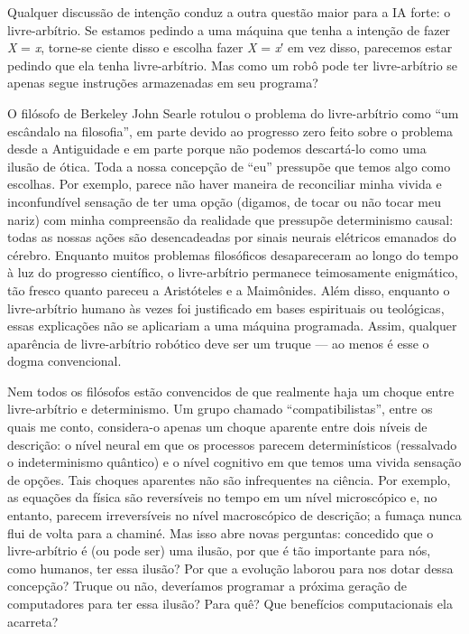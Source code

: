 \documentclass[11pt,a5paper,twoside]{book}
\begin{document}
Qualquer discussão de intenção conduz a outra questão maior para a IA forte: o livre-arbítrio. Se estamos pedindo a uma máquina que tenha a intenção de fazer \textit{X} = \textit{x}, torne-se ciente disso e escolha fazer \textit{X} = \textit{x}′ em vez disso, parecemos estar pedindo que ela tenha livre-arbítrio. Mas como um robô pode ter livre-arbítrio se apenas segue instruções armazenadas em seu programa?

O filósofo de Berkeley John Searle rotulou o problema do livre-arbítrio como “um escândalo na filosofia”, em parte devido ao progresso zero feito sobre o problema desde a Antiguidade e em parte porque não podemos descartá-lo como uma ilusão de ótica. Toda a nossa concepção de “eu” pressupõe que temos algo como escolhas. Por exemplo, parece não haver maneira de reconciliar minha vivida e inconfundível sensação de ter uma opção (digamos, de tocar ou não tocar meu nariz) com minha compreensão da realidade que pressupõe determinismo causal: todas as nossas ações são desencadeadas por sinais neurais elétricos emanados do cérebro. Enquanto muitos problemas filosóficos desapareceram ao longo do tempo à luz do progresso científico, o livre-arbítrio permanece teimosamente enigmático, tão fresco quanto pareceu a Aristóteles e a Maimônides. Além disso, enquanto o livre-arbítrio humano às vezes foi justificado em bases espirituais ou teológicas, essas explicações não se aplicariam a uma máquina programada. Assim, qualquer aparência de livre-arbítrio robótico deve ser um truque — ao menos é esse o dogma convencional.

Nem todos os filósofos estão convencidos de que realmente haja um choque entre livre-arbítrio e determinismo. Um grupo chamado “compatibilistas”, entre os quais me conto, considera-o apenas um choque aparente entre dois níveis de descrição: o nível neural em que os processos parecem determinísticos (ressalvado o indeterminismo quântico) e o nível cognitivo em que temos uma vivida sensação de opções. Tais choques aparentes não são infrequentes na ciência. Por exemplo, as equações da física são reversíveis no tempo em um nível microscópico e, no entanto, parecem irreversíveis no nível macroscópico de descrição; a fumaça nunca flui de volta para a chaminé. Mas isso abre novas perguntas: concedido que o livre-arbítrio é (ou pode ser) uma ilusão, por que é tão importante para nós, como humanos, ter essa ilusão? Por que a evolução laborou para nos dotar dessa concepção? Truque ou não, deveríamos programar a próxima geração de computadores para ter essa ilusão? Para quê? Que benefícios computacionais ela acarreta?
\end{document}
